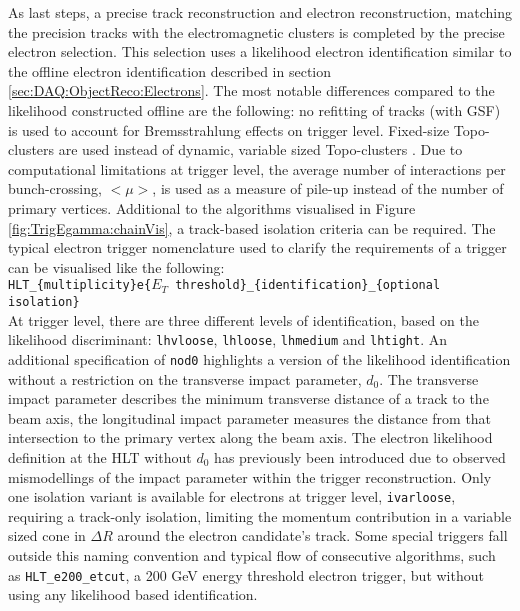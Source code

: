 As last steps,  a precise track reconstruction and electron reconstruction,  matching the precision tracks with the electromagnetic clusters is completed by the precise electron selection.  This selection uses a likelihood electron identification similar to the offline electron identification described in section \ref{sec:DAQ:ObjectReco:Electrons}.  The most notable differences compared to the likelihood constructed offline are the following: no refitting of tracks (with \ac{GSF}) is used to account for Bremsstrahlung effects on trigger level.  Fixed-size Topo-clusters are used instead of dynamic, variable sized Topo-clusters \cite{ElectronRecoID1516}.  Due to computational limitations at trigger level, the average number of interactions per bunch-crossing, $<\mu>$, is used as a measure of pile-up instead of the number of primary vertices.
Additional to the algorithms visualised in Figure \ref{fig:TrigEgamma:chainVis},  a track-based isolation criteria can be required. 
The typical electron trigger nomenclature used to clarify the requirements of a trigger can be visualised like the following: \\
\texttt{HLT\_\{multiplicity\}e\{$E_T$ threshold\}\_\{identification\}\_\{optional isolation\}}\\
At trigger level,  there are three different levels of identification, based on the likelihood discriminant: \texttt{lhvloose}, \texttt{lhloose}, \texttt{lhmedium} and \texttt{lhtight}.  An additional specification of \texttt{nod0} highlights a version of the likelihood identification without a restriction on the transverse impact parameter,  $d_0$. The transverse impact parameter describes the minimum transverse distance of a track to the beam axis, the longitudinal impact parameter measures the distance from that intersection to the primary vertex along the beam axis.  The electron likelihood definition at the \ac{HLT} without $d_0$ has previously been introduced due to observed mismodellings of the impact parameter within the trigger reconstruction. Only one isolation variant is available for electrons at trigger level,  \texttt{ivarloose},  requiring a track-only isolation,  limiting the momentum contribution in a variable sized cone in $\Delta R$ around the electron candidate's track.  Some special triggers fall outside this naming convention and typical flow of consecutive algorithms,  such as \texttt{HLT\_e200\_etcut},  a 200 GeV energy threshold electron trigger,  but without using any likelihood based identification. 


